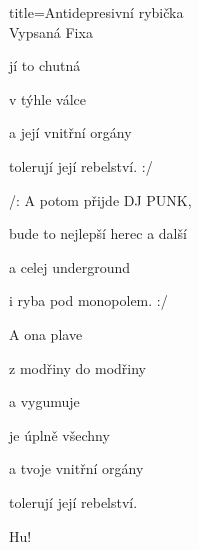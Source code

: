 \begin{song}{title=\predtitle \centering Antidepresivní rybička \\\large Vypsaná Fixa   \vspace*{-0.3cm}}
\begin{centerjustified}
\begin{varwidth}[t]{0.48\textwidth}
  jí to chutná  

  v týhle válce 

  a její vnitřní orgány

  tolerují její rebelství. :/

\sloka 
  /: A potom přijde DJ PUNK,

  bude to nejlepší herec a další 

  a celej underground 

  i ryba pod monopolem. :/

  A ona plave 
  
  z modřiny do modřiny

  a vygumuje 

  je úplně všechny

  a tvoje vnitřní orgány 

  tolerují její rebelství.

  Hu!



\end{varwidth}
\end{centerjustified}
\setcounter{Slokočet}{0}
\end{song}

